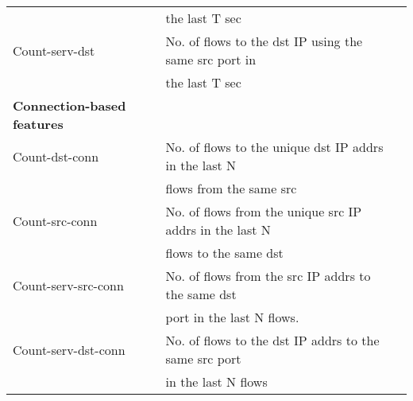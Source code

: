 {\begin{tabular}{llr}
		& the last T sec\\
		Count-serv-dst & No. of flows to the dst IP using the same src port in\\
		&  the last T sec\\
		\textbf{Connection-based features} & \\
		Count-dst-conn & No. of flows to the unique dst IP addrs in the last N\\
		&  flows from the same src\\
		Count-src-conn & No. of flows from the unique src IP addrs in the last N\\
		&  flows to the same dst\\
		Count-serv-src-conn & No. of flows from the src IP addrs to the same dst \\
		&  port in the last N flows.\\
		Count-serv-dst-conn & No. of flows to the dst IP addrs to the same src port \\
		&  in the last N flows\\
		\hline
	\end{tabular}
}

\bigskip
\bigskip
\bigskip
\bigskip
\bigskip
\bigskip
\bigskip
\bigskip

